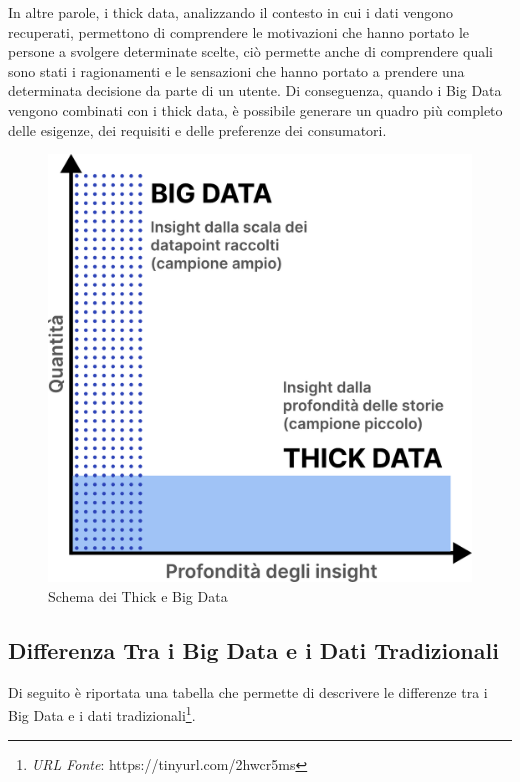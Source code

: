 In altre parole, i thick data, analizzando il contesto in cui i dati vengono recuperati, permettono di comprendere le motivazioni che hanno portato le persone a svolgere determinate scelte, ciò permette anche di comprendere quali sono stati i ragionamenti e le sensazioni che hanno portato a prendere una determinata decisione da parte di un utente. Di conseguenza, quando i Big Data vengono combinati con i thick data, è possibile generare un quadro più completo delle esigenze, dei requisiti e delle preferenze dei consumatori.

\begin{figure}[H]
    \centering
    \includegraphics[width=0.5\linewidth]{figure/capitolo_2/Thick and Big Data.pdf}
    \caption{Schema dei Thick e Big Data}
    \label{fig:Thick and Big Data}
\end{figure}

\subsection{Differenza Tra i Big Data e i Dati Tradizionali}

Di seguito è riportata una tabella che permette di descrivere le differenze tra i Big Data e i dati tradizionali\footnote{\textit{URL Fonte}: https://tinyurl.com/2hwcr5ms}.

